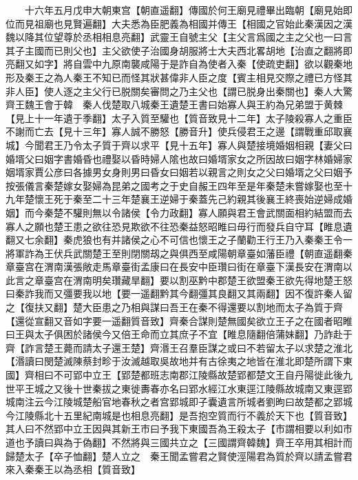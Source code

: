 　　十六年五月戊申大朝東宫【朝直遥翻】傳國於何王廟見禮畢出臨朝【廟見始即位而見祖廟也見賢遍翻】大夫悉為臣肥義為相國并傳王【相國之官始此秦漢因之漢魏以降其位望尊於丞相相息亮翻】武靈王自號主父【主父言爲國之主之父也一曰言其子主國而已則父也】主父欲使子治國身胡服將士大夫西北畧胡地【治直之翻將即亮翻又如字】將自雲中九原南襲咸陽于是詐自為使者入秦【使疏吏翻】欲以觀秦地形及秦王之為人秦王不知已而怪其狀甚偉非人臣之度【賓主相見交際之禮已方怪其非人臣】使人逐之主父行已脱關矣審問之乃主父也【謂已脱身出秦關也】秦人大驚　齊王魏王會于韓　秦人伐楚取八城秦王遺楚王書曰始寡人與王約為兄弟盟于黄棘【見上十一年遺于季翻】太子入質至驩也【質音致見十二年】太子陵殺寡人之重臣不謝而亡去【見十三年】寡人誠不勝怒【勝音升】使兵侵君王之邊【謂戰重邱取襄城】今聞君王乃令太子質于齊以求平【見十五年】寡人與楚接境婚姻相親【妻父曰婚壻父曰姻字書婚昏也禮娶以昏時婦人隂也故曰婚壻家女之所因故曰姻字林婚婦家姻壻家賈公彦曰各據男女身則男曰昏女曰姻若以親言之則女之父曰婚壻之父曰姻予按張儀言秦楚嫁女娶婦為昆弟之國考之于史自赧王四年至是年秦楚未嘗嫁娶也至十九年楚懷王死于秦至二十三年楚襄王逆婦于秦蓋先己約親其後襄王終喪始逆婦成婚姻】而今秦楚不驩則無以令諸侯【令力政翻】寡人願與君王會武關面相約結盟而去寡人之願也楚王患之欲往恐見欺欲不往恐秦益怒昭睢曰毋行而發兵自守耳【睢息遺翻又七余翻】秦虎狼也有并諸侯之心不可信也懷王之子蘭勸王行王乃入秦秦王令一將軍詐為王伏兵武關楚王至則閉關刼之與俱西至咸陽朝章臺如藩臣禮【朝直遥翻秦章臺宫在渭南漢張敞走馬章臺街孟康曰在長安中臣瓚曰街在章臺下漢長安在渭南以此言之章臺宫在渭南明矣瓚藏旱翻】要以割巫黔中郡楚王欲盟秦王欲先得地楚王怒曰秦詐我而又彊要我以地【要一遥翻黔其今翻彊其良翻又其兩翻】因不復許秦人留之【復扶又翻】楚大臣患之乃相與謀曰吾王在秦不得還要以割地而太子為質于齊【還從宣翻又音如字要一遥翻質音致】齊秦合謀則楚無國矣欲立王子之在國者昭睢曰王與太子俱困於諸侯今又倍王命而立其庶子不宜【睢息隨翻倍蒲妹翻】乃詐赴于齊【詐言楚王薨而請太子還王楚】齊湣王召羣臣謀之或曰不若留太子以求楚之淮北【湣讀曰閔楚滅陳蔡封畛于汝滅越取吳故地并有古徐夷之地皆在淮北即楚所謂下東國】齊相曰不可郢中立王【郢楚都班志南郡江陵縣故楚郢都楚文王自丹陽徙此後九世平王城之又後十世秦拔之東徙夀春亦名曰郢水經江水東逕江陵縣故城南又東逕郢城南注云今江陵城楚船官地春秋之者宫郢城即子囊遺言所城者劉昫曰故楚都之郢城今江陵縣北十五里紀南城是也相息亮翻】是吾抱空質而行不義於天下也【質音致】其人曰不然郢中立王因與其新王市曰予我下東國吾為王殺太子【市謂相要以利如市道也予讀曰與為于偽翻】不然將與三國共立之【三國謂齊韓魏】齊王卒用其相計而歸楚太子【卒子恤翻】楚人立之　秦王聞孟嘗君之賢使涇陽君為質於齊以請孟嘗君來入秦秦王以為丞相【質音致】

